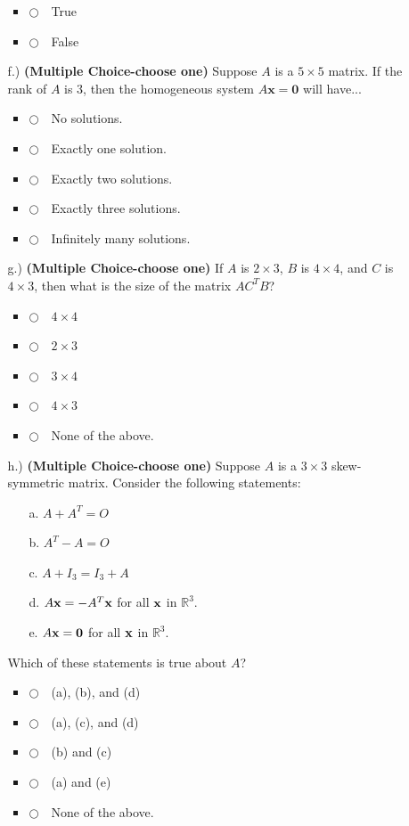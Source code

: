 \documentclass[12pt]{extarticle}
\newcommand{\chooseone}{{\Large$\Circle$\ \ }}
\begin{document}
\begin{enumerate}
\begin{itemize}
\begin{itemize}[label={}]
\item \chooseone True
\item \chooseone False
\end{itemize}


\newpage

\item[f.) ]  \textbf{(Multiple Choice-choose one)} Suppose $A$ is a $5\times 5$ matrix. If the rank of $A$ is 3, then the homogeneous system $A\mathbf{x}=\mathbf{0}$ will have...
\begin{itemize}[label={}]
\item \chooseone No solutions.
\item \chooseone Exactly one solution.
\item \chooseone Exactly two solutions.
\item \chooseone Exactly three solutions.
\item \chooseone Infinitely many solutions.
\end{itemize}

\vspace{2cm}


\item[g.) ]\textbf{(Multiple Choice-choose one)} If $A$ is $2\times 3$, $B$ is $4\times 4$, and $C$ is $4\times 3$, then what is the size of the matrix $AC^{T}B$?
\begin{itemize}[label={}]
\item \chooseone $4\times 4$
\item \chooseone $2\times 3$
\item \chooseone $3\times 4$
\item \chooseone $4\times 3$
\item \chooseone None of the above.
\end{itemize}
\vspace{2cm}


\item[h.) ]\textbf{(Multiple Choice-choose one)} Suppose $A$ is a $3\times 3$ skew-symmetric matrix. Consider the following statements: %
\begin{itemize}
\item[a.]	$A+A^T = O$
\item[b.] $A^T-A = O$
\item[c.]	$A+I_3 = I_3+A$
\item[d.] $A{\mathbf{x}} =-A^T{\mathbf{x}}$ for all ${\mathbf{x}}$ in $\mathbb{R}^3$.
\item[e.] $A{\mathbf{x}} = \mathbf{0}$ for all ${\mathbf{x}}$ in $\mathbb{R}^3$.
\end{itemize}
Which of these statements is true about $A$?
\begin{itemize}[label={}]
\item \chooseone (a), (b), and (d)
\item \chooseone (a), (c), and (d)
\item \chooseone (b) and (c)
\item \chooseone (a) and (e)
\item \chooseone None of the above.
\end{itemize}


\end{itemize}
\end{enumerate}
\end{document}
